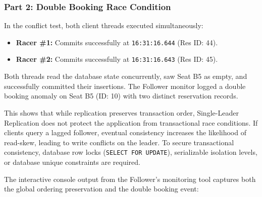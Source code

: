 \documentclass[12pt]{article}
\begin{document}
\subsubsection{Part 2: Double Booking Race Condition}
In the conflict test, both client threads executed simultaneously:
\begin{itemize}
    \item \textbf{Racer \#1:} Commits successfully at \texttt{16:31:16.644} (Res ID: 44).
    \item \textbf{Racer \#2:} Commits successfully at \texttt{16:31:16.643} (Res ID: 45).
\end{itemize}
Both threads read the database state concurrently, saw Seat B5 as empty, and successfully committed their insertions. The Follower monitor logged a double booking anomaly on Seat B5 (ID: 10) with two distinct reservation records.

This shows that while replication preserves transaction order, Single-Leader Replication does not protect the application from transactional race conditions. If clients query a lagged follower, eventual consistency increases the likelihood of read-skew, leading to write conflicts on the leader. To secure transactional consistency, database row locks (\texttt{SELECT FOR UPDATE}), serializable isolation levels, or database unique constraints are required.

The interactive console output from the Follower's monitoring tool captures both the global ordering preservation and the double booking event:
\end{document}
